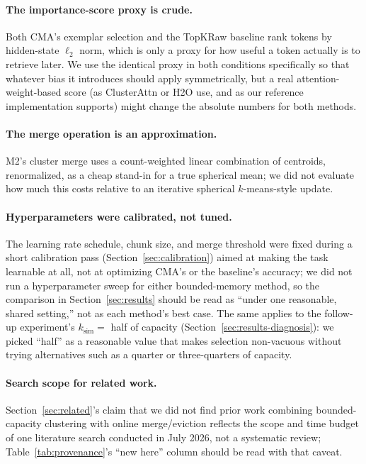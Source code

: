 \documentclass[11pt]{article}
\begin{document}
\paragraph{The importance-score proxy is crude.} Both CMA's exemplar selection and the TopKRaw
baseline rank tokens by hidden-state $\ell_2$ norm, which is only a proxy for how useful a token
actually is to retrieve later. We use the identical proxy in both conditions specifically so
that whatever bias it introduces should apply symmetrically, but a real attention-weight-based
score (as ClusterAttn or H2O use, and as our reference implementation supports) might change the
absolute numbers for both methods.

\paragraph{The merge operation is an approximation.} M2's cluster merge uses a count-weighted
linear combination of centroids, renormalized, as a cheap stand-in for a true spherical mean; we
did not evaluate how much this costs relative to an iterative spherical $k$-means-style update.

\paragraph{Hyperparameters were calibrated, not tuned.} The learning rate schedule, chunk size,
and merge threshold were fixed during a short calibration pass (Section~\ref{sec:calibration})
aimed at making the task learnable at all, not at optimizing CMA's or the baseline's accuracy;
we did not run a hyperparameter sweep for either bounded-memory method, so the comparison in
Section~\ref{sec:results} should be read as ``under one reasonable, shared setting,'' not as
each method's best case. The same applies to the follow-up experiment's $k_{\text{sim}} = $
half of capacity (Section~\ref{sec:results-diagnosis}): we picked ``half'' as a reasonable value
that makes selection non-vacuous without trying alternatives such as a quarter or three-quarters
of capacity.

\paragraph{Search scope for related work.} Section~\ref{sec:related}'s claim that we did not
find prior work combining bounded-capacity clustering with online merge/eviction reflects the
scope and time budget of one literature search conducted in July 2026, not a systematic review;
Table~\ref{tab:provenance}'s ``new here'' column should be read with that caveat.
\end{document}

